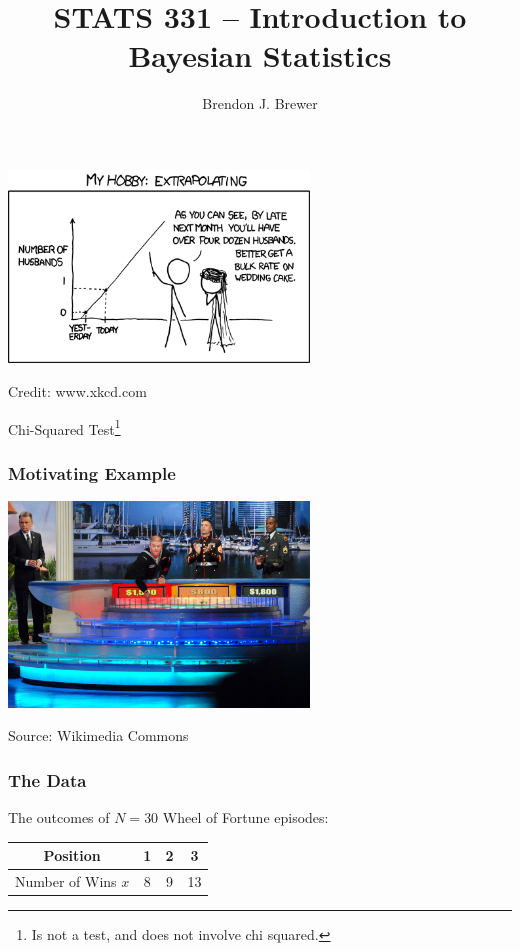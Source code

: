 \documentclass{beamer}
\author{Brendon J. Brewer}
\title{STATS 331 -- Introduction to Bayesian Statistics}
\institute{The University of Auckland}
\date{}
\begin{document}
\frame{\titlepage}

\begin{frame}
\begin{center}
\includegraphics[width=0.6\textwidth]{images/extrapolating.png}

Credit: www.xkcd.com
\end{center}

\end{frame}


\begin{frame}
\Large

\begin{center}
Chi-Squared Test\footnote{Is not a test, and does not involve chi squared.}
\end{center}
\end{frame}


\begin{frame}
\frametitle{Motivating Example}

\begin{center}
\includegraphics[width=0.6\textwidth]{images/wheel_of_fortune.png}

Source: Wikimedia Commons
\end{center}

\end{frame}


\begin{frame}
\frametitle{The Data}
The outcomes of $N=30$ Wheel of Fortune episodes:

\begin{center}
\begin{tabular}{|c|ccc|}
\hline
Position & 1 & 2 & 3 \\
\hline
Number of Wins $x$ & 8 & 9 & 13 \\
\hline 
\end{tabular}
\end{center}

\end{frame}
\end{document}
